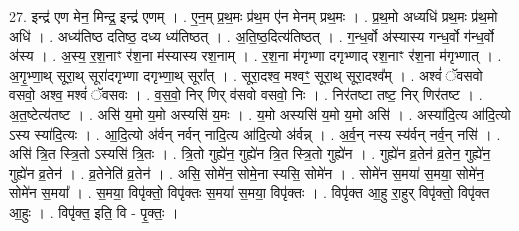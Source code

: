 \documentclass[17pt]{extarticle}
\begin{document}
27. इन्द्र॑ एण मेन॒ मिन्द्र॒ इन्द्र॑ एणम् । . ए॒न॒म् प्र॒थ॒मः प्र॑थ॒म ए॑न मेनम् प्रथ॒मः । . प्र॒थ॒मो अध्यधि॑ प्रथ॒मः प्र॑थ॒मो अधि॑ । . अध्य॑तिष्ठ दतिष्ठ॒ दध्य ध्य॑तिष्ठत् । . अ॒ति॒ष्ठ॒दित्य॑तिष्ठत् । . ग॒न्ध॒र्वो अ॑स्यास्य गन्ध॒र्वो ग॑न्ध॒र्वो अ॑स्य । . अ॒स्य॒ र॒श॒नाꣳ र॑श॒ना म॑स्यास्य रश॒नाम् । . र॒श॒ना म॑गृभ्णा दगृभ्णाद् रश॒नाꣳ र॑श॒ना म॑गृभ्णात् । . अ॒गृ॒भ्णा॒थ् सूरा॒थ् सूरा॑दगृभ्णा दगृभ्णा॒थ् सूरा᳚त् । . सूरा॒दश्व॒ मश्वꣳ॒॒ सूरा॒थ् सूरा॒दश्व᳚म् । . अश्वं॑ ॅवसवो वसवो॒ अश्व॒ मश्वं॑ ॅवसवः । . व॒स॒वो॒ निर् णिर् व॑सवो वसवो॒ निः । . निर॑तष्टा तष्ट॒ निर् णिर॑तष्ट । . अ॒त॒ष्टेत्य॑तष्ट । . असि॑ य॒मो य॒मो अस्यसि॑ य॒मः । . य॒मो अस्यसि॑ य॒मो य॒मो असि॑ । . अस्या॑दि॒त्य आ॑दि॒त्यो ऽस्य स्या॑दि॒त्यः । . आ॒दि॒त्यो अ॑र्वन् नर्वन् नादि॒त्य आ॑दि॒त्यो अ॑र्वन्न् । . अ॒र्व॒न् नस्य स्य॑र्वन् नर्व॒न् नसि॑ । . असि॑ त्रि॒त स्त्रि॒तो ऽस्यसि॑ त्रि॒तः । . त्रि॒तो गुह्ये॑न॒ गुह्ये॑न त्रि॒त स्त्रि॒तो गुह्ये॑न । . गुह्ये॑न व्र॒तेन॑ व्र॒तेन॒ गुह्ये॑न॒ गुह्ये॑न व्र॒तेन॑ । . व्र॒तेनेति॑ व्र॒तेन॑ । . असि॒ सोमे॑न॒ सोमे॒ना स्यसि॒ सोमे॑न । . सोमे॑न स॒मया॑ स॒मया॒ सोमे॑न॒ सोमे॑न स॒मया᳚ । . स॒मया॒ विपृ॑क्तो॒ विपृ॑क्तः स॒मया॑ स॒मया॒ विपृ॑क्तः । . विपृ॑क्त आ॒हु रा॒हुर् विपृ॑क्तो॒ विपृ॑क्त आ॒हुः । . विपृ॑क्त॒ इति॒ वि - पृ॒क्तः॒ । \newline
\end{document}
